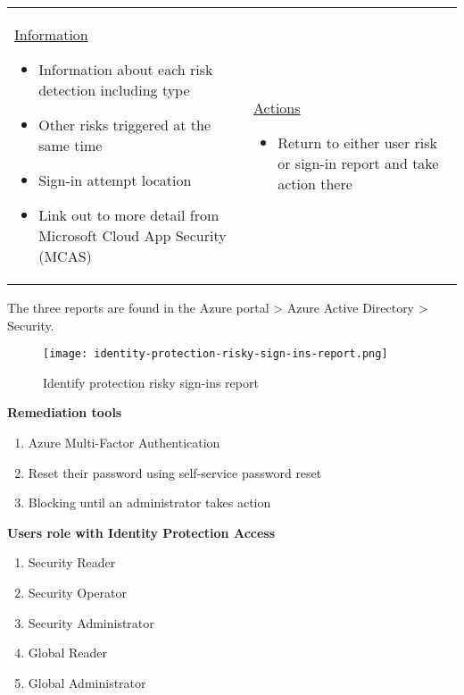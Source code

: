 \begin{itemize}
	\begin{tabular}{p{7cm}p{7cm}}
	\underline{Information}
		\begin{itemize}
		\item Information about each risk detection including type
		\item Other risks triggered at the same time
		\item Sign-in attempt location
		\item Link out to more detail from Microsoft Cloud App Security (MCAS)
		\end{itemize} &
	\underline{Actions}
		\begin{itemize}
		\item Return to either user risk or sign-in report and take action there
		\end{itemize}
	\end{tabular}
\end{itemize}
The three reports are found in the Azure portal > Azure Active Directory > Security.
\begin{figure}[!h]
\texttt{[image: identity-protection-risky-sign-ins-report.png]}
\caption{Identify protection risky sign-ins report}
\end{figure}

\textbf{Remediation tools}
\begin{enumerate}
\item Azure Multi-Factor Authentication
\item Reset their password using self-service password reset
\item Blocking until an administrator takes action
\end{enumerate}

\textbf{Users role with Identity Protection Access}
\begin{enumerate}
\item Security Reader
\item Security Operator
\item Security Administrator
\item Global Reader
\item Global Administrator
\end{enumerate}

